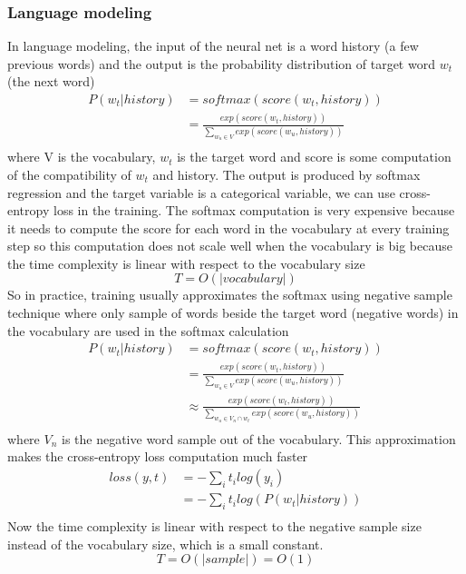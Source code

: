 \subsubsection{Language modeling}
In language modeling, the input of the neural net is a word history (a few previous words) and the output is the probability distribution of target word $ w_t $ (the next word)
\begin{align*}
	P(w_t | history)
	&= softmax(score(w_t, history)) \\
	&= \frac{exp(score(w_t, history))}{\sum_{w_u \in V}exp(score(w_u, history))}\\
\end{align*}
where V is the vocabulary, $ w_t $ is the target word and score is some computation of the compatibility of $ w_t $ and history.
The output is produced by softmax regression and the target variable is a categorical variable, we can use cross-entropy loss in the training.
The softmax computation is very expensive because it needs to compute the score for each word in the vocabulary at every training step so this computation does not scale well when the vocabulary is big because the time complexity is linear with respect to the vocabulary size
\[T = O(|vocabulary|)\]
So in practice, training usually approximates the softmax using negative sample technique where only sample of words beside the target word (negative words) in the vocabulary are used in the softmax calculation
\begin{align*}
	P(w_t | history)
	&= softmax(score(w_t, history)) \\
	&= \frac{exp(score(w_t, history))}{\sum_{w_u \in V}exp(score(w_u, history))}\\
	&\approx \frac{exp(score(w_t, history))}{\sum_{w_u \in V_n \cap {w_t}}exp(score(w_u, history))}\\
\end{align*}
where $ V_n $ is the negative word sample out of the vocabulary.
This approximation makes the cross-entropy loss computation much faster \cite{mnih2013learning}
\begin{align*}
	loss(y, t)
	&= - \sum_i t_i log(y_i)\\
	&= - \sum_i t_i log(P(w_t | history))\\
\end{align*}
Now the time complexity is linear with respect to the negative sample size instead of the vocabulary size, which is a small constant.
\[T = O(|sample|) = O(1)\]


